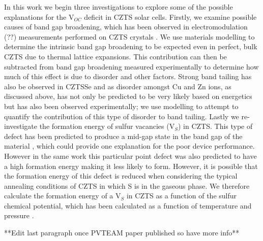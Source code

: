 In this work we begin three investigations to explore some of the possible explanations for the V$_{OC}$ deficit in CZTS solar cells. Firstly, we examine possible causes of band gap broadening, which has been observed in electromodulation (??) measurements performed on CZTS crystals \cite{PVTEAM_paper}. We use materials modelling to determine the intrinsic band gap broadening to be expected even in perfect, bulk CZTS due to thermal lattice expansions. This contribution can then be subtracted from band gap broadening measured experimentally to determine how much of this effect is due to disorder and other factors. Strong band tailing has also be observed in CZTSSe \cite{band_tail} and as disorder amongst Cu and Zn ions, as discussed above, has not only be predicted to be very likely based on energetics but has also been observed experimentally; we use modelling to attempt to quantify the contribution of this type of disorder to band tailing. Lastly we re-investigate the formation energy of sulfur vacancies (V$_S$) in CZTS. This type of defect has been predicted to produce a mid-gap state in the band gap of the material \cite{defect1}, which could provide one explanation for the poor device performance. However in the same work this particular point defect was also predicted to have a high formation energy making it less likely to form. However, it is possible that the formation energy of this defect is reduced when considering the typical annealing conditions of CZTS in which S is in the gaseous phase. We therefore calculate the formation energy of a V$_S$ in CZTS as a function of the sulfur chemical potential, which has been calculated as a function of temperature and pressure \cite{Adam_sulfur}.

**Edit last paragraph once PVTEAM paper published so have more info**
 


